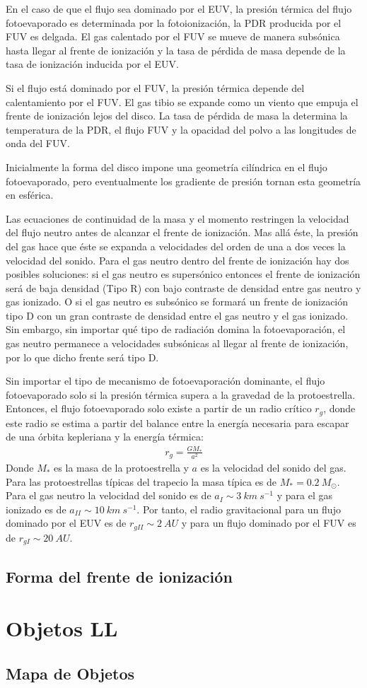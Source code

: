 En el caso de que el flujo sea dominado por el EUV, la presión térmica del
flujo fotoevaporado es determinada por la fotoionización, la PDR producida
por el FUV es delgada. El gas calentado por el FUV se mueve de manera
subsónica hasta llegar al frente de ionización y la tasa de pérdida de masa
depende de la tasa de ionización inducida por el EUV.

Si el flujo está dominado por el FUV, la presión térmica depende del
calentamiento por el FUV. El gas tibio se expande como un viento que empuja
el frente de ionización lejos del disco. La tasa de pérdida de masa
la determina la temperatura de la PDR, el flujo FUV y la opacidad del polvo
a las longitudes de onda del FUV.

Inicialmente la forma del disco impone una geometría cilíndrica en el
flujo fotoevaporado, pero eventualmente los gradiente de presión tornan
esta geometría en esférica.

Las ecuaciones de continuidad de la masa y el momento restringen la velocidad
del flujo neutro antes de alcanzar el frente de ionización. Mas allá éste,
la presión del gas hace que éste se expanda a velocidades del orden de una a
dos veces la velocidad del sonido. Para el gas neutro dentro del frente de
ionización hay dos posibles soluciones: si el gas neutro es supersónico
entonces el frente de ionización será de baja densidad (Tipo R) con bajo
contraste de densidad entre gas neutro y gas ionizado. O si el gas neutro
es subsónico se formará un frente de ionización tipo D con un gran contraste
de densidad entre el gas neutro y el gas ionizado. Sin embargo, sin importar
qué tipo de radiación domina la fotoevaporación, el gas neutro permanece a
velocidades subsónicas al llegar al frente de ionización, por lo que dicho
frente será tipo D. 


Sin importar el tipo de mecanismo de fotoevaporación dominante, el flujo
fotoevaporado solo si la presión térmica supera a la gravedad de la
protoestrella. Entonces, el flujo fotoevaporado solo existe a partir de
un radio crítico $r_g$, donde este radio se estima a partir del balance
entre la energía necesaria para escapar de una órbita kepleriana y la
energía térmica:
\begin{align}
  r_g = \frac{GM_*}{a^2}
\end{align}
Donde $M_*$ es la masa de la protoestrella y $a$ es la velocidad del sonido
del gas. Para las protoestrellas típicas del trapecio la masa típica es de
$M_* = 0.2~M_\odot$. Para el gas neutro la velocidad del sonido es de
$a_I \sim 3~km~s^{-1}$ y para el gas ionizado es de $a_{II} \sim 10~km~s^{-1}$.
Por tanto, el radio gravitacional para un flujo dominado por el EUV es de
$r_{gII} \sim 2~AU$ y para un flujo dominado por el FUV es de
$r_{gI} \sim 20~AU$.

\subsection{Forma del frente de ionización \citep{Johnstone:1998}}





\section{Objetos LL}
\subsection{Mapa de Objetos}